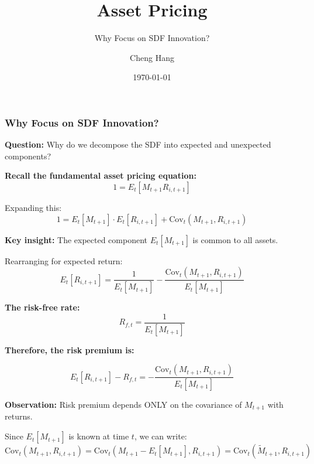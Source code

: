 \documentclass{beamer}
\title[Asset Pricing]{\textbf{Asset Pricing}} %
\subtitle{Why Focus on SDF Innovation?}
\author[Cheng Hang]{Cheng Hang} %
\institute[DUFE] %
{School of Fintech \\
Dongbei University of Finance \& Economics \\ %
\medskip
\textbf{chenghangch@qq.com}%
}
\date{\today} %
\begin{document}
\begin{frame}
\titlepage %
\end{frame}


\begin{frame}[allowframebreaks]
    \frametitle{Why Focus on SDF Innovation?}
    
    \textbf{Question:} Why do we decompose the SDF into expected and unexpected components?
    
    \textbf{Recall the fundamental asset pricing equation:}
    \begin{equation*}
        1 = E_t[M_{t+1} R_{i,t+1}]
    \end{equation*}
    
    Expanding this:
    \begin{equation*}
        1 = E_t[M_{t+1}] \cdot E_t[R_{i,t+1}] + \text{Cov}_t(M_{t+1},R_{i,t+1})
    \end{equation*}
    
    \framebreak
    
    \textbf{Key insight:} The expected component $E_t[M_{t+1}]$ is common to all assets.
    
    Rearranging for expected return:
    \begin{equation*}
        E_t[R_{i,t+1}] = \frac{1}{E_t[M_{t+1}]}  - \frac{\text{Cov}_t(M_{t+1}, R_{i,t+1})}{E_t[M_{t+1}]}
    \end{equation*}
    
    \textbf{The risk-free rate:}
    \begin{equation*}
      R_{f,t} = \frac{1}{E_t[M_{t+1}]}
    \end{equation*}
    
    \textbf{Therefore, the risk premium is:}
    \begin{tcolorbox}[colback=orange!5!white, colframe=orange!75!black]
    \begin{equation*}
        E_t[R_{i,t+1}] - R_{f,t} = -\frac{\text{Cov}_t(M_{t+1}, R_{i,t+1})}{E_t[M_{t+1}]}
    \end{equation*}
    \end{tcolorbox}
    
    \framebreak
    
    \textbf{Observation:} Risk premium depends ONLY on the covariance of $M_{t+1}$ with returns.
    
    Since $E_t[M_{t+1}]$ is known at time $t$, we can write:
    \begin{equation*}
        \text{Cov}_t(M_{t+1}, R_{i,t+1}) = \text{Cov}_t(M_{t+1} - E_t[M_{t+1}], R_{i,t+1}) = \text{Cov}_t(\tilde{M}_{t+1}, R_{i,t+1})
    \end{equation*}
    

\end{frame}
\end{document}
